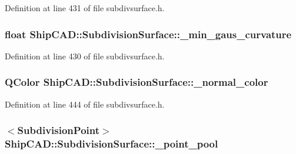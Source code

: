 Definition at line 431 of file subdivsurface.\+h.

\subsubsection[{\texorpdfstring{\+\_\+min\+\_\+gaus\+\_\+curvature}{_min_gaus_curvature}}]{\setlength{\rightskip}{0pt plus 5cm}float Ship\+C\+A\+D\+::\+Subdivision\+Surface\+::\+\_\+min\+\_\+gaus\+\_\+curvature\hspace{0.3cm}{\ttfamily [protected]}}\hypertarget{classShipCAD_1_1SubdivisionSurface_ac343c30f7e4e6a5926fdfed7da3f9385}{}\label{classShipCAD_1_1SubdivisionSurface_ac343c30f7e4e6a5926fdfed7da3f9385}


Definition at line 430 of file subdivsurface.\+h.

\subsubsection[{\texorpdfstring{\+\_\+normal\+\_\+color}{_normal_color}}]{\setlength{\rightskip}{0pt plus 5cm}Q\+Color Ship\+C\+A\+D\+::\+Subdivision\+Surface\+::\+\_\+normal\+\_\+color\hspace{0.3cm}{\ttfamily [protected]}}\hypertarget{classShipCAD_1_1SubdivisionSurface_a62cbe24451a794c0da3660ed0f1066ca}{}\label{classShipCAD_1_1SubdivisionSurface_a62cbe24451a794c0da3660ed0f1066ca}


Definition at line 444 of file subdivsurface.\+h.

\subsubsection[{\texorpdfstring{\+\_\+point\+\_\+pool}{_point_pool}}]{$<${\bf Subdivision\+Point}$>$ Ship\+C\+A\+D\+::\+Subdivision\+Surface\+::\+\_\+point\+\_\+pool\hspace{0.3cm}{\ttfamily [protected]}}\hypertarget{classShipCAD_1_1SubdivisionSurface_a58736ba52015c2d17f0c67ba12406699}{}\label{classShipCAD_1_1SubdivisionSurface_a58736ba52015c2d17f0c67ba12406699}


